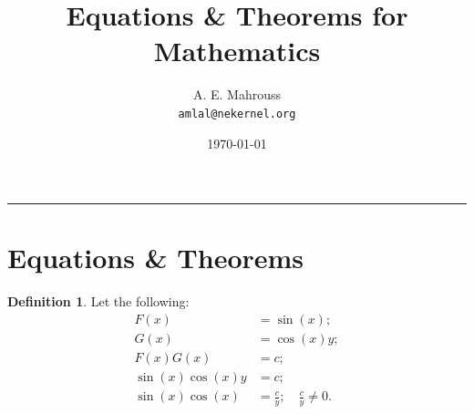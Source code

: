 \documentclass[10pt]{article}
\title{%
  \vspace{-1.5em}%
  \large\textbf{Equations \& Theorems for Mathematics}%
}
\author{A. E. Mahrouss\\\texttt{amlal@nekernel.org}}
\date{\today}
\theoremstyle{plain}
\theoremstyle{definition}
\newtheorem{definition}[theorem]{Definition}
\theoremstyle{remark}
\begin{document}
  \maketitle
\vspace{-0.5em}
\vspace{0.8em}
\rule{\linewidth}{0.4pt}
\vspace{1em}

\section{Equations \& Theorems}

\begin{definition}
	Let the following:
	\begin{align*}
		F(x) &= \sin(x);\\
		G(x) &= \cos(x)y;\\
		F(x)G(x) &= c;\\
		\sin(x)\cos(x)y &= c;\\
		\sin(x)\cos(x) &= \frac{c}{y}; \quad \frac{c}{y} \neq 0.
	\end{align*}
\end{definition}

\nocite{*}



\end{document}
